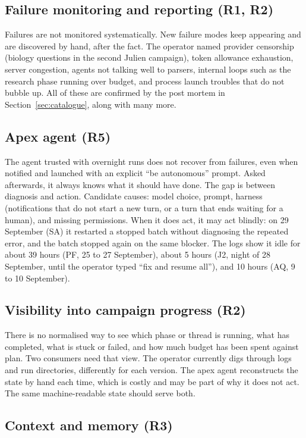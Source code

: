 \documentclass[11pt,a4paper]{article}
\begin{document}
\subsection{Failure monitoring and reporting (R1, R2)}

Failures are not monitored systematically. New failure modes keep appearing and
are discovered by hand, after the fact. The operator named provider censorship
(biology questions in the second Julien campaign), token allowance exhaustion,
server congestion, agents not talking well to parsers, internal loops such as the
research phase running over budget, and process launch troubles that do not
bubble up. All of these are confirmed by the post mortem in
Section~\ref{sec:catalogue}, along with many more.

\subsection{Apex agent (R5)}

The agent trusted with overnight runs does not recover from failures, even when
notified and launched with an explicit ``be autonomous'' prompt. Asked afterwards,
it always knows what it should have done. The gap is between diagnosis and action.
Candidate causes: model choice, prompt, harness (notifications that do not start a
new turn, or a turn that ends waiting for a human), and missing permissions. When it does act, it may act blindly: on 29 September (SA)
it restarted a stopped batch without diagnosing the repeated error, and the batch
stopped again on the same blocker. The logs show it idle for about 39 hours (PF, 25 to 27 September), about 5 hours (J2,
night of 28 September, until the operator typed ``fix and resume all''), and 10
hours (AQ, 9 to 10 September).

\subsection{Visibility into campaign progress (R2)}

There is no normalised way to see which phase or thread is running, what has
completed, what is stuck or failed, and how much budget has been spent against
plan. Two consumers need that view. The operator currently digs through logs and
run directories, differently for each version. The apex agent reconstructs the
state by hand each time, which is costly and may be part of why it does not act.
The same machine-readable state should serve both.

\subsection{Context and memory (R3)}
\end{document}
